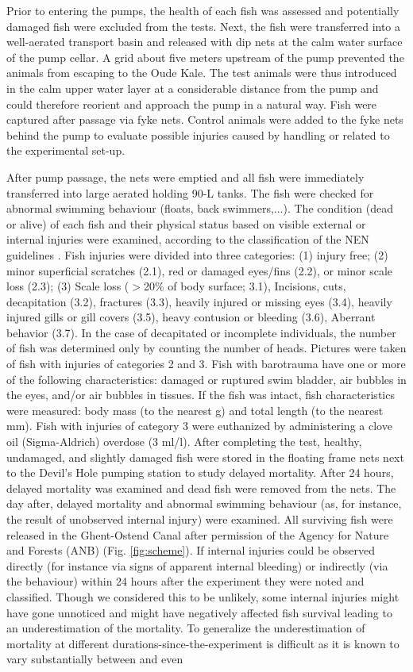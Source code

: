 \documentclass[fleqn,10pt]{wlscirep}
\begin{document}
Prior to entering the pumps, the health of each fish was assessed and potentially damaged fish were excluded from the tests. Next, the fish were transferred into a well-aerated transport basin and released with dip nets at the calm water surface of the pump cellar. A grid about five meters upstream of the pump prevented the animals from escaping to the Oude Kale. The test animals were thus introduced in the calm upper water layer at a considerable distance from the pump and could therefore reorient and approach the pump in a natural way. Fish were captured after passage via fyke nets. Control animals were added to the fyke nets behind the pump to evaluate possible injuries caused by handling or related to the experimental set-up.

After pump passage, the nets were emptied and all fish were immediately transferred into large aerated holding 90-L tanks. The fish were checked for abnormal swimming behaviour (floats, back swimmers,...). The condition (dead or alive) of each fish and their physical status based on visible external or internal injuries were examined, according to the classification of the NEN guidelines \cite{vanBerkel2020NENPlants}. Fish injuries were divided into three categories: (1) injury free; (2) minor superficial scratches (2.1), red or damaged eyes/fins (2.2), or minor scale loss (2.3); (3) Scale loss ($>$20\% of body surface; 3.1), Incisions, cuts, decapitation (3.2), fractures (3.3), heavily injured or missing eyes (3.4), heavily injured gills or gill covers (3.5), heavy contusion or bleeding (3.6), Aberrant behavior (3.7). In the case of decapitated or incomplete individuals, the number of fish was determined only by counting the number of heads. Pictures were taken of fish with injuries of categories 2 and 3. Fish with barotrauma have one or more of the following characteristics: damaged or ruptured swim bladder, air bubbles in the eyes, and/or air bubbles in tissues. If the fish was intact, fish characteristics were measured: body mass (to the nearest g) and total length (to the nearest mm). Fish with injuries of category 3 were euthanized by administering a clove oil (Sigma-Aldrich) overdose (3 ml/l). After completing the test, healthy, undamaged, and slightly damaged fish were stored in the floating frame nets next to the Devil’s Hole pumping station to study delayed mortality. After 24 hours, delayed mortality was examined and dead fish were removed from the nets. The day after, delayed mortality and abnormal swimming behaviour (as, for instance, the result of unobserved internal injury) were examined. All surviving fish were released in the Ghent-Ostend Canal after permission of the Agency for Nature and Forests (ANB) (Fig. \ref{fig:scheme}). If internal injuries could be observed directly (for instance via signs of apparent internal bleeding) or indirectly (via the behaviour) within 24 hours after the experiment they were noted and classified. Though we considered this to be unlikely, some internal injuries might have gone unnoticed and might have negatively affected fish survival leading to an underestimation of the mortality. To generalize the underestimation of mortality at different durations-since-the-experiment is difficult as it is known to vary substantially between and even 
\end{document}
